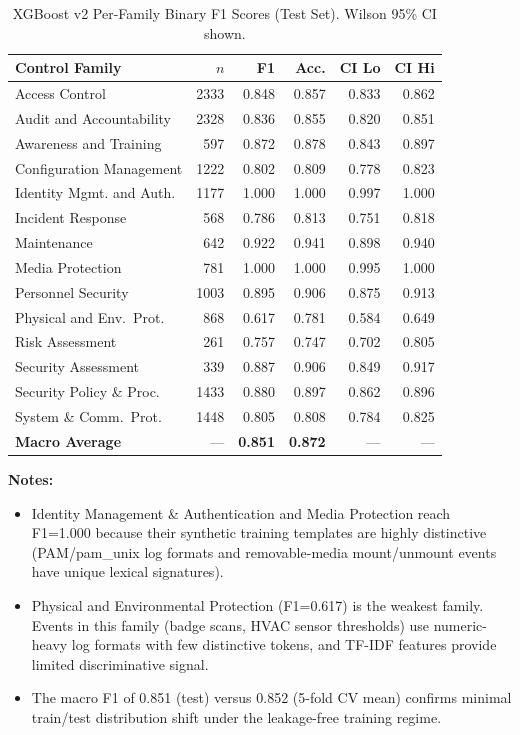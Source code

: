 \documentclass[11pt,a4paper]{article}
\begin{document}
\begin{table}[H]
\centering
\caption{XGBoost v2 Per-Family Binary F1 Scores (Test Set). Wilson 95\% CI shown.}
\label{tab:per-family-f1}
\begin{tabular}{lrrrrr}
\toprule
\textbf{Control Family} & \textbf{$n$} & \textbf{F1} & \textbf{Acc.} & \textbf{CI Lo} & \textbf{CI Hi} \\
\midrule
Access Control              & 2333 & 0.848 & 0.857 & 0.833 & 0.862 \\
Audit and Accountability    & 2328 & 0.836 & 0.855 & 0.820 & 0.851 \\
Awareness and Training      &  597 & 0.872 & 0.878 & 0.843 & 0.897 \\
Configuration Management    & 1222 & 0.802 & 0.809 & 0.778 & 0.823 \\
Identity Mgmt. and Auth.    & 1177 & 1.000 & 1.000 & 0.997 & 1.000 \\
Incident Response           &  568 & 0.786 & 0.813 & 0.751 & 0.818 \\
Maintenance                 &  642 & 0.922 & 0.941 & 0.898 & 0.940 \\
Media Protection            &  781 & 1.000 & 1.000 & 0.995 & 1.000 \\
Personnel Security          & 1003 & 0.895 & 0.906 & 0.875 & 0.913 \\
Physical and Env.\ Prot.    &  868 & 0.617 & 0.781 & 0.584 & 0.649 \\
Risk Assessment             &  261 & 0.757 & 0.747 & 0.702 & 0.805 \\
Security Assessment         &  339 & 0.887 & 0.906 & 0.849 & 0.917 \\
Security Policy \& Proc.    & 1433 & 0.880 & 0.897 & 0.862 & 0.896 \\
System \& Comm.\ Prot.      & 1448 & 0.805 & 0.808 & 0.784 & 0.825 \\
\midrule
\textbf{Macro Average}      & —    & \textbf{0.851} & \textbf{0.872} & — & — \\
\bottomrule
\end{tabular}
\end{table}

\noindent\textbf{Notes:}
\begin{itemize}
  \item Identity Management \& Authentication and Media Protection reach F1=1.000 because
    their synthetic training templates are highly distinctive (PAM/pam\_unix log formats and
    removable-media mount/unmount events have unique lexical signatures).
  \item Physical and Environmental Protection (F1=0.617) is the weakest family. Events in
    this family (badge scans, HVAC sensor thresholds) use numeric-heavy log formats with
    few distinctive tokens, and TF-IDF features provide limited discriminative signal.
  \item The macro F1 of 0.851 (test) versus 0.852 (5-fold CV mean) confirms minimal
    train/test distribution shift under the leakage-free training regime.
\end{itemize}
\end{document}
